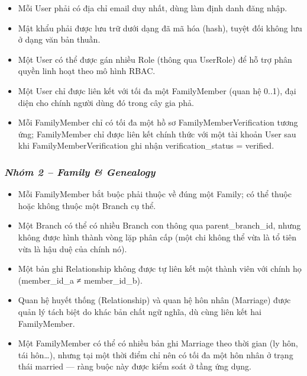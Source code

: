 \begin{itemize}
\item
  Mỗi User phải có địa chỉ email duy nhất, dùng làm định danh đăng nhập.
\item
  Mật khẩu phải được lưu trữ dưới dạng đã mã hóa (hash), tuyệt đối không lưu ở dạng văn bản thuần.
\item
  Một User có thể được gán nhiều Role (thông qua UserRole) để hỗ trợ phân quyền linh hoạt theo mô hình RBAC.
\item
  Một User chỉ được liên kết với tối đa một FamilyMember (quan hệ 0..1), đại diện cho chính người dùng đó trong cây gia phả.
\item
  Mỗi FamilyMember chỉ có tối đa một hồ sơ FamilyMemberVerification tương ứng; FamilyMember chỉ được liên kết chính thức với một tài khoản User sau khi FamilyMemberVerification ghi nhận verification\_status = \textquotesingle verified\textquotesingle.
\end{itemize}

\hypertarget{nhuxf3m-2-family-genealogy}{%
\subsubsection{\texorpdfstring{\emph{\textbf{Nhóm 2 -- Family \& Genealogy}}}{Nhóm 2 -- Family \& Genealogy}}\label{nhuxf3m-2-family-genealogy}}

\begin{itemize}
\item
  Mỗi FamilyMember bắt buộc phải thuộc về đúng một Family; có thể thuộc hoặc không thuộc một Branch cụ thể.
\item
  Một Branch có thể có nhiều Branch con thông qua parent\_branch\_id, nhưng không được hình thành vòng lặp phân cấp (một chi không thể vừa là tổ tiên vừa là hậu duệ của chính nó).
\item
  Một bản ghi Relationship không được tự liên kết một thành viên với chính họ (member\_id\_a ≠ member\_id\_b).
\item
  Quan hệ huyết thống (Relationship) và quan hệ hôn nhân (Marriage) được quản lý tách biệt do khác bản chất ngữ nghĩa, dù cùng liên kết hai FamilyMember.
\item
  Một FamilyMember có thể có nhiều bản ghi Marriage theo thời gian (ly hôn, tái hôn\ldots), nhưng tại một thời điểm chỉ nên có tối đa một hôn nhân ở trạng thái \textquotesingle married\textquotesingle{} --- ràng buộc này được kiểm soát ở tầng ứng dụng.
\end{itemize}

